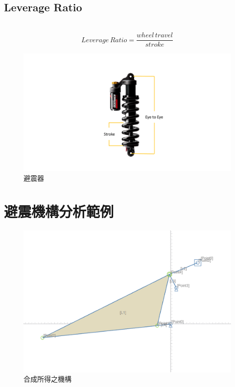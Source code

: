 \documentclass[14pt,a4paper]{report}  %
\newcommand{\fourteen}{\fontsize{14pt}{\baselineskip}\selectfont}%
\begin{document}
{       
       \hspace*{\fill} \\
       \subsection{Leverage Ratio}
       \fourteen {Leverage ratio是避震器壓縮量和後輪行程的比值，當較大的槓桿比率會對避震器產生較大的衝擊，而在騎乘時對於地形變化的感受度較不敏感，相反地較小的槓桿比率對於地形的敏感度較高。其計算方式如下所示。}
       \hspace*{\fill} \\
       \begin{equation}
       Leverage\, Ratio = \frac{wheel\,travel}{stroke}
       \end{equation}

       
       \begin{figure}[hbt!]
        \centering
        \includegraphics[scale=0.4]{stroke.png}
        \caption{避震器}
        \label{fig_stroke:scale}
    	\end{figure}
       
       
       \section{避震機構分析範例}
       \fourteen {此小節會將4.1節所得到的結果並配合4.2節所介紹的評比標準進行討論以檢驗是否得到最佳的尺寸。}
		\begin{figure}[hbt!]
        \centering
        \includegraphics[scale=0.4]{Firebird_mechanism.png}
        \caption{合成所得之機構}
        \label{fig_Firebird_mechanism:scale}
    	\end{figure}
		
}
\end{document}
